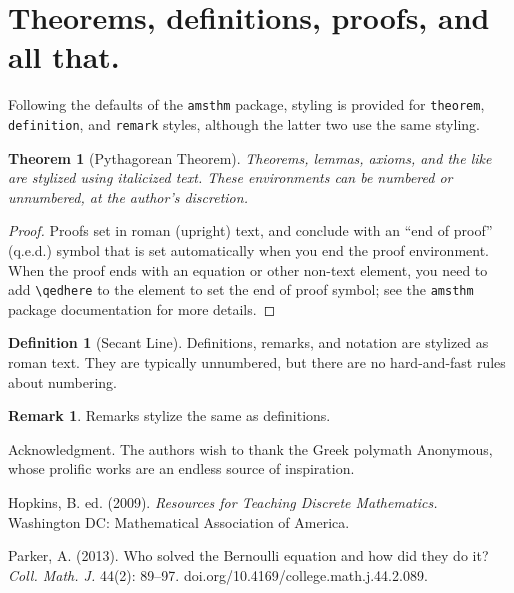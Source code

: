 \documentclass{article}
\theoremstyle{theorem}
\newtheorem{theorem}{Theorem}
\theoremstyle{definition}
\newtheorem*{definition}{Definition}
\newtheorem*{remark}{Remark}
\begin{document}
\section{Theorems, definitions, proofs, and all that.}

Following the defaults of the \texttt{amsthm} package, styling is provided for \texttt{theorem}, \texttt{definition}, and \texttt{remark} styles, although the latter two use the same styling.

\begin{theorem}[Pythagorean Theorem]
Theorems, lemmas, axioms, and the like are stylized using italicized text. These environments can be numbered or unnumbered, at the author's discretion.
\end{theorem}

\begin{proof}
Proofs set in roman (upright) text, and conclude with an ``end of proof'' (q.e.d.) symbol that is set automatically when you end the proof environment.  When the proof ends with an equation or other non-text element, you need to add \verb~\qedhere~ to the element to set the end of proof symbol; see the \texttt{amsthm} package documentation for more details.
\end{proof}

\begin{definition}[Secant Line]
Definitions, remarks, and notation are stylized as roman text.  They are typically unnumbered, but there are no hard-and-fast rules about numbering.
\end{definition}

\begin{remark}
Remarks stylize the same as definitions.
\end{remark}


\begin{acknowledgment}{Acknowledgment.}
The authors wish to thank the Greek polymath Anonymous, whose prolific works are an endless source of inspiration.
\end{acknowledgment}

\begin{thebibliography}{2}
 Hopkins, B. ed. (2009). \textit{Resources for Teaching Discrete Mathematics.} Washington DC: Mathematical Association of America.

 Parker, A. (2013). Who solved the Bernoulli equation and how did they do it? \textit{Coll. Math. J.} 44(2): 89--97. doi.org/10.4169/college.math.j.44.2.089.

\end{thebibliography}
\end{document}
